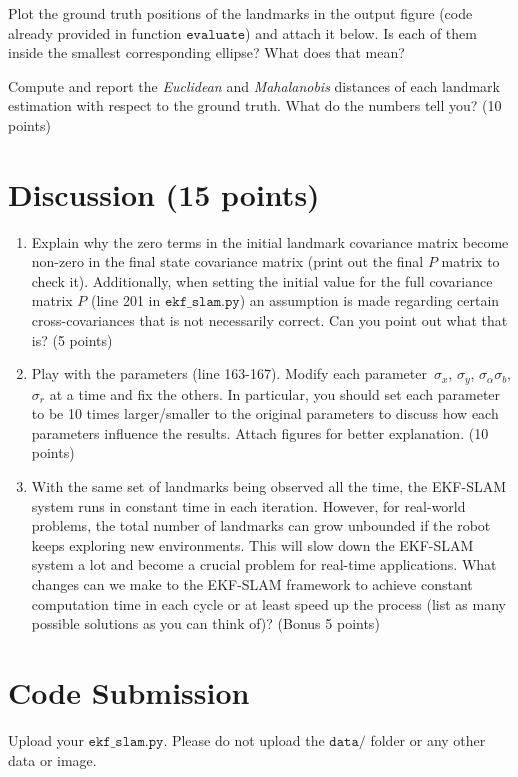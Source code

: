 \documentclass[12pt, a4paper]{article}
\begin{document}
\begin{enumerate}
	      Plot the ground truth positions of the landmarks in the output figure
	      (code already provided in function $\mathtt{evaluate}$)
	      and attach it below. Is each of them inside the smallest corresponding
	      ellipse? What does that mean?

	      Compute and report the \emph{Euclidean} and
	      \emph{Mahalanobis} distances of each landmark estimation with respect
	      to the ground truth. What do the numbers tell you? (10 points)
\end{enumerate}

\section{Discussion (15 points)}

\begin{enumerate}
	\item Explain why the zero terms in the initial landmark covariance
	      matrix become non-zero in the final state covariance matrix (print
	      out the final $P$ matrix to check it). Additionally, when setting
	      the initial value for the full covariance matrix $P$ (line 201 in
	      $\mathtt{ekf\_slam.py}$) an assumption is made regarding certain cross-covariances
	      that is not necessarily correct. Can you point out what that is? (5
	      points)

	\item Play with the parameters (line 163-167). Modify each parameter~$\sigma_{x}$,
	      $\sigma_{y}$, $\sigma_{\alpha}$$\sigma_{b}$, $\sigma_{r}$ at a
	      time and fix the others. In particular, you should set each parameter
	      to be 10 times larger/smaller to the original parameters to discuss
	      how each parameters influence the results. Attach figures for
	      better explanation. (10 points)


	\item With the same set of landmarks being observed all the time, the
	      EKF-SLAM system runs in constant time in each iteration. However,
	      for real-world problems, the total number of landmarks can grow unbounded
	      if the robot keeps exploring new environments. This will slow down
	      the EKF-SLAM system a lot and become a crucial problem for real-time
	      applications. What changes can we make to the EKF-SLAM framework to
	      achieve constant computation time in each cycle or at least speed
	      up the process (list as many possible solutions as you can think of)?
	      (Bonus 5 points)
\end{enumerate}

\section{Code Submission}

Upload your $\mathtt{ekf\_slam.py}$.
Please do not upload the $\mathtt{data/}$ folder or any other data
or image.
\end{document}

